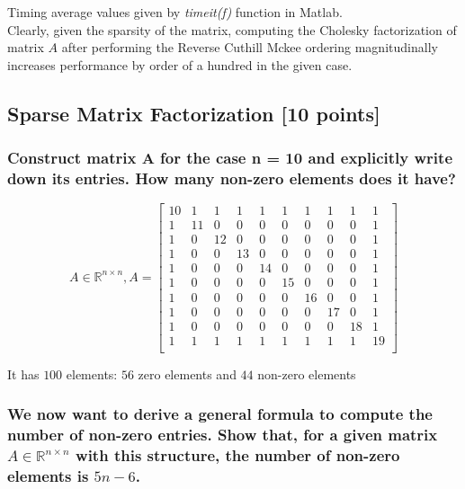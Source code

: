 \documentclass[unicode,11pt,a4paper,oneside,numbers=endperiod,openany]{scrartcl}
\begin{document}
Timing average values given by \textit{timeit(f)} function in Matlab. \\
Clearly, given the sparsity of the matrix, computing the Cholesky factorization of matrix $A$
after performing the Reverse Cuthill Mckee ordering magnitudinally increases performance by order
of a hundred in the given case.

\cleardoublepage

\subsection{Sparse Matrix Factorization [10 points]}

\subsubsection{Construct matrix A for the case n = 10 and explicitly write down its entries. How many non-zero elements does it have?}

\begin{equation} \label{ex6-matrixA}
    A \in \mathbb{R}^{n \times n}, A =
    \begin{bmatrix}
        10 & 1  & 1  & 1  & 1  & 1  & 1  & 1  & 1  & 1  \\
        1  & 11 & 0  & 0  & 0  & 0  & 0  & 0  & 0  & 1  \\
        1  & 0  & 12 & 0  & 0  & 0  & 0  & 0  & 0  & 1  \\
        1  & 0  & 0  & 13 & 0  & 0  & 0  & 0  & 0  & 1  \\
        1  & 0  & 0  & 0  & 14 & 0  & 0  & 0  & 0  & 1  \\
        1  & 0  & 0  & 0  & 0  & 15 & 0  & 0  & 0  & 1  \\
        1  & 0  & 0  & 0  & 0  & 0  & 16 & 0  & 0  & 1  \\
        1  & 0  & 0  & 0  & 0  & 0  & 0  & 17 & 0  & 1  \\
        1  & 0  & 0  & 0  & 0  & 0  & 0  & 0  & 18 & 1  \\
        1  & 1  & 1  & 1  & 1  & 1  & 1  & 1  & 1  & 19 \\
    \end{bmatrix}
\end{equation}

It has $100$ elements: $56$ zero elements and $44$ non-zero elements

\subsubsection{We now want to derive a general formula to compute the number of non-zero entries.
    Show that, for a given matrix $A \in \mathbb{R}^{n \times n}$ with this structure,
    the number of non-zero elements is $5n - 6$.}
\end{document}
